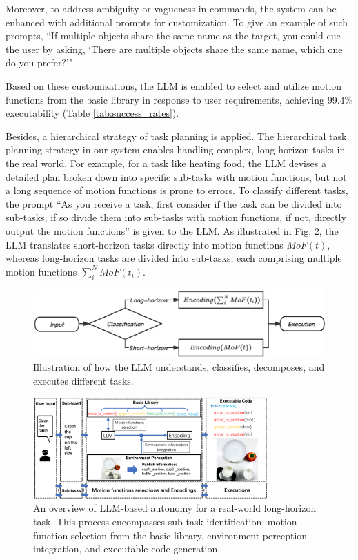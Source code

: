 \documentclass[letterpaper,conference]{ieeeconf}
\begin{document}
Moreover, to address ambiguity or vagueness in commands, the system can be enhanced with additional prompts for customization. To give an example of such prompts, ``If multiple objects share the same name as the target, you could cue the user by asking, `There are multiple objects share the same name, which one do you prefer?'"

Based on these customizations, the LLM is enabled to select and utilize motion functions from the basic library in response to user requirements, achieving 99.4\% executability (Table \ref{tab:success_rates}).

Besides, a hierarchical strategy of task planning is applied. The hierarchical task planning strategy in our system enables handling complex, long-horizon tasks in the real world. For example, for a task like heating food, the LLM devises a detailed plan broken down into specific sub-tasks with motion functions, but not a long sequence of motion functions is prone to errors.
To classify different tasks, the prompt “As you receive a task, first consider if the task can be divided into sub-tasks, if so divide them into sub-tasks with motion functions, if not, directly output the motion functions” is given to the LLM. As illustrated in Fig. 2, the LLM translates short-horizon tasks directly into motion functions \(MoF(t)\), whereas long-horizon tasks are divided into sub-tasks, each comprising multiple motion functions \(\sum^N_iMoF(t_i)\).
\begin{figure}[t]
\vspace{2mm}
    \centering
    \includegraphics[width=0.9\linewidth]{classify.png}
    \captionsetup{skip=2pt}
    \caption{Illustration of how the LLM understands, classifies, decomposes, and executes different tasks.}
    \label{fig:long-horizon}
 \vspace{-5mm}
\end{figure}
\begin{figure}[t]
\vspace{1mm}
    \centering
    \includegraphics[width=0.8\textwidth]{LLM-autonomy.pdf}
    \captionsetup{skip=0pt}
    \caption{An overview of LLM-based autonomy for a real-world long-horizon task. This process encompasses sub-task identification, motion function selection from the basic library, environment perception integration, and executable code generation.}
    \label{fig:autonomy}
 \vspace{-5mm}
\end{figure}
\end{document}
